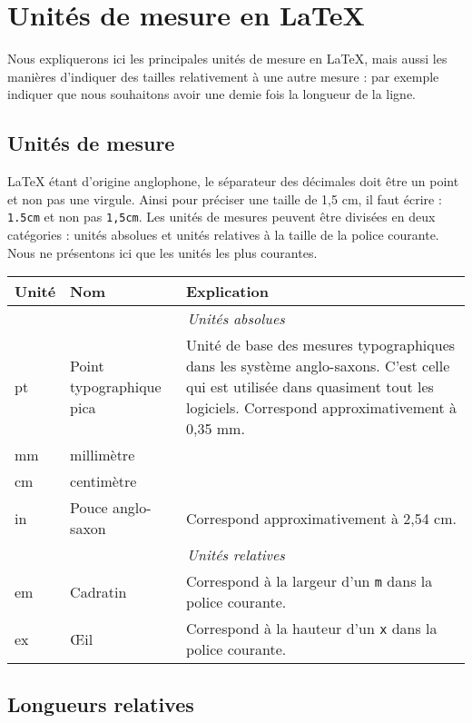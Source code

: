 \chapter{Unités de mesure en \LaTeX{}}

\begin{prealable}
	Nous expliquerons ici les principales unités de mesure en \LaTeX{}, mais aussi les manières d'indiquer des tailles relativement à une autre mesure : par exemple indiquer que nous souhaitons avoir une demie fois la longueur de la ligne.
\end{prealable}

\section{Unités de mesure}

\LaTeX{} étant d'origine anglophone, le séparateur des décimales doit être un point et non pas une virgule. Ainsi pour préciser une taille de 1,5 cm, il faut écrire : \verb|1.5cm| et non pas \verb|1,5cm|.
Les unités de mesures peuvent être divisées en deux catégories : unités absolues et unités relatives à la taille  de la police courante. Nous ne présentons ici que les unités les plus courantes.



\begin{longtable}{llp{15em}}
	Unité & Nom & Explication \\
	\endhead
	\multicolumn{3}{c}{\emph{Unités absolues}} \\
	pt & Point typographique pica & Unité de base des mesures typographiques dans les système anglo-saxons. C'est celle qui est utilisée dans quasiment tout les logiciels. Correspond approximativement à 0,35 mm. \\
	mm & millimètre &  \\
	cm  & centimètre & \\
	in    & Pouce anglo-saxon & Correspond approximativement à 2,54 cm. \\
	\multicolumn{3}{c}{\emph{Unités relatives}} \\
	em & Cadratin & Correspond à la largeur d'un \verb|m| dans la police courante. \\
	ex  & Œil & Correspond à la hauteur d'un \verb|x| dans la police courante. \\
\end{longtable}

\section{Longueurs relatives}

